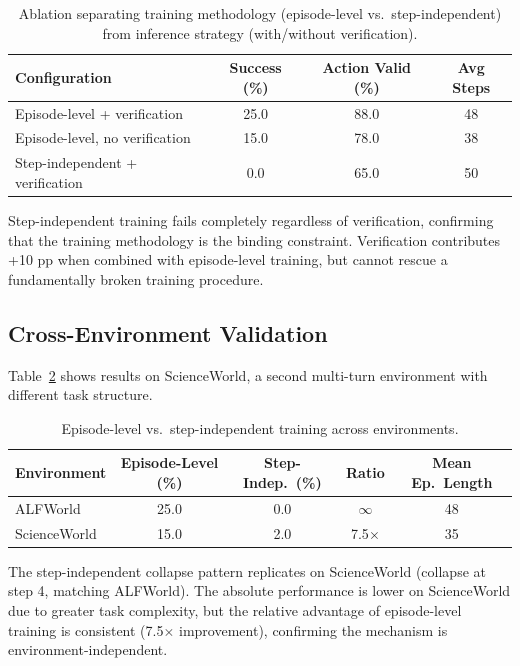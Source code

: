 \documentclass[11pt]{article}
\begin{document}
\begin{table}[h]
\centering
\caption{Ablation separating training methodology (episode-level vs.\ step-independent) from inference strategy (with/without verification).}
\label{tab:verify}
\begin{tabular}{@{}lccc@{}}
\toprule
Configuration & Success (\%) & Action Valid (\%) & Avg Steps \\
\midrule
Episode-level + verification & 25.0 & 88.0 & 48 \\
Episode-level, no verification & 15.0 & 78.0 & 38 \\
Step-independent + verification & 0.0 & 65.0 & 50 \\
\bottomrule
\end{tabular}
\end{table}

Step-independent training fails completely regardless of verification, confirming that the training methodology is the binding constraint. Verification contributes +10 pp when combined with episode-level training, but cannot rescue a fundamentally broken training procedure.

\subsection{Cross-Environment Validation}

Table~\ref{tab:crossenv} shows results on ScienceWorld, a second multi-turn environment with different task structure.

\begin{table}[h]
\centering
\caption{Episode-level vs.\ step-independent training across environments.}
\label{tab:crossenv}
\begin{tabular}{@{}lcccc@{}}
\toprule
Environment & Episode-Level (\%) & Step-Indep.\ (\%) & Ratio & Mean Ep.\ Length \\
\midrule
ALFWorld & 25.0 & 0.0 & $\infty$ & 48 \\
ScienceWorld & 15.0 & 2.0 & 7.5$\times$ & 35 \\
\bottomrule
\end{tabular}
\end{table}

The step-independent collapse pattern replicates on ScienceWorld (collapse at step 4, matching ALFWorld). The absolute performance is lower on ScienceWorld due to greater task complexity, but the relative advantage of episode-level training is consistent (7.5$\times$ improvement), confirming the mechanism is environment-independent.
\end{document}
